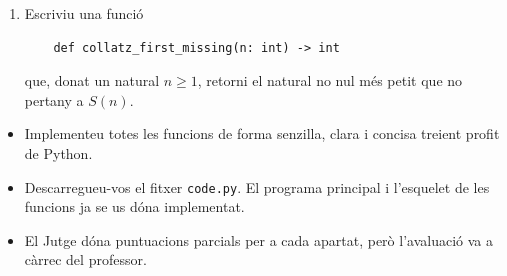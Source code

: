 \begin{enumerate}
    que generi la llista infinita de valors inicials pels quals el seu element més alt és més gran que qualsevol dels valors inicials menors Altrament dit, es vol la seqüència des\-crita per $[i \mid \max S(i) > \max S(j) \ \ \forall j < i]$.


    \item Escriviu una funció 

    \begin{lstlisting}
    def collatz_first_missing(n: int) -> int
    \end{lstlisting}\vspace*{-6mm}

    que, donat un natural $n\ge1$, retorni el natural no nul més petit que no pertany a $S(n)$.

\end{enumerate}

\Observations

\begin{itemize}

\item    Implementeu totes les funcions de forma senzilla, clara i concisa treient profit de Python.

\item Descarregueu-vos el fitxer \texttt{code.py}. El programa principal i l'esquelet de les funcions ja se us dóna implementat.

\item El Jutge dóna puntuacions parcials per a cada apartat, però l'avaluació va a càrrec del professor.

\end{itemize}


\SampleOneCol
